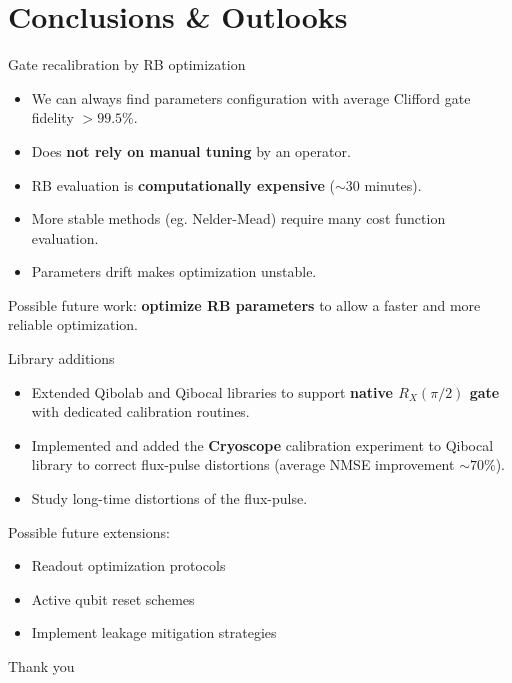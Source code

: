 \documentclass[aspectratio=169,10pt]{beamer}
\begin{document}
\section{Conclusions \& Outlooks}

\begin{frame}{Gate recalibration by RB optimization}
  \begin{itemize}
    \item[\ding{51}] We can always find parameters configuration with average Clifford gate fidelity $> 99.5\%$.
    \item[\ding{51}] Does \textbf{not rely on manual tuning} by an operator.
    \item[\ding{55}] RB evaluation is \textbf{computationally expensive} ($\sim 30$ minutes).
    \item[\ding{55}] More stable methods (eg. Nelder-Mead) require many cost function evaluation.
    \item[\ding{55}] Parameters drift makes optimization unstable.
  \end{itemize}
  Possible future work: \textbf{optimize RB parameters} to allow a faster and more reliable optimization.
\end{frame}

\begin{frame}{Library additions}
  \begin{itemize}
    \item[\ding{51}] Extended Qibolab and Qibocal libraries to support \textbf{native $R_X(\pi/2)$ gate} with dedicated calibration routines.
    \item[\ding{51}] Implemented and added the \textbf{Cryoscope} calibration experiment to Qibocal library to correct flux-pulse distortions (average NMSE improvement $\sim 70\%$).
    \item[\ding{55}] Study long-time distortions of the flux-pulse.
  \end{itemize}
  Possible future extensions: 
  \begin{itemize}[label={\raisebox{0.2ex}{\tiny$\bullet$}}]
    \item Readout optimization protocols
    \item Active qubit reset schemes
    \item Implement leakage mitigation strategies
  \end{itemize}
\end{frame}

\begin{frame}[t,standout]
\Large
Thank you
\end{frame}
\end{document}
